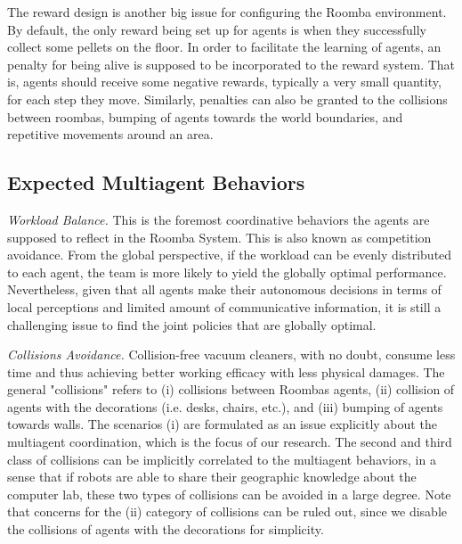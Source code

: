 \documentclass[conference]{IEEEtran}
\begin{document}
The reward design is another big issue for
configuring the Roomba environment. By default, the only reward being set up
for agents is when they successfully collect some pellets on the floor. In
order to facilitate the learning of agents, an penalty for being alive is
supposed to be incorporated to the reward system. That is, agents should
receive some negative rewards, typically a very small quantity, for each step
they move. Similarly, penalties can also be granted to the collisions between
roombas, bumping of agents towards the world boundaries, and repetitive
movements around an area.

\subsection{Expected Multiagent Behaviors}

\textit{Workload Balance.} This is the foremost coordinative behaviors the
agents are supposed to reflect in the Roomba System. This is also known as
competition avoidance. From the global perspective, if the workload can be
evenly distributed to each agent, the team is more likely to yield the
globally optimal performance.  
Nevertheless, given that all agents make their autonomous decisions in terms
of local perceptions and limited amount of communicative information, 
it is still a challenging issue to find the joint policies that are globally
optimal. 

\textit{Collisions Avoidance.} Collision-free vacuum cleaners, with no doubt,
consume less time and thus achieving better working efficacy with less
physical damages.  The general "collisions" refers to (i) collisions between
Roombas agents, (ii) collision of agents with the decorations (i.e.  desks,
chairs, etc.), and (iii) bumping of agents towards walls.  The scenarios (i)
are formulated as an issue explicitly about the multiagent coordination, which
is the focus of our research.  The second and third class of collisions can be
implicitly correlated to the multiagent behaviors, in a sense that if robots
are able to share their geographic knowledge about the computer lab, these two
types of collisions can be avoided in a large degree. Note that concerns for
the (ii) category of collisions can be ruled out, since we disable the
collisions of agents with the decorations for simplicity.
\end{document}
